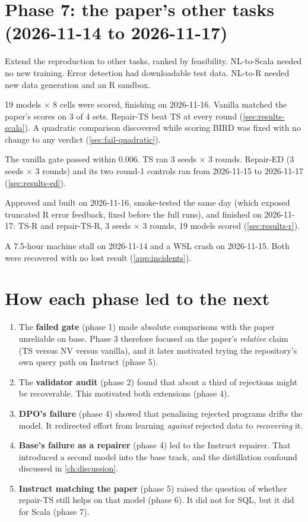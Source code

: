 \section{Phase 7: the paper's other tasks (2026-11-14 to 2026-11-17)}

\begin{description}[style=nextline,leftmargin=1.2em]
\item[Motivation.] Extend the reproduction to other tasks, ranked by feasibility. NL-to-Scala needed no new training.
Error detection had downloadable test data. NL-to-R needed new data generation and an R sandbox.
\item[NL-to-Scala.] 19 models $\times$ 8 cells were scored, finishing on 2026-11-16. Vanilla matched the paper's
scores on 3 of 4 sets. Repair-TS beat TS at every round (\cref{sec:results-scala}). A quadratic
comparison discovered while scoring BIRD was fixed with no change to any verdict (\cref{sec:fail-quadratic}).
\item[Error detection.] The vanilla gate passed within 0.006. TS ran 3 seeds $\times$ 3 rounds. Repair-ED (3 seeds $\times$
3 rounds) and its two round-1 controls ran from 2026-11-15 to 2026-11-17 (\cref{sec:results-ed}).
\item[NL-to-R.] Approved and built on 2026-11-16, smoke-tested the same day (which exposed truncated R error feedback,
fixed before the full runs), and finished on 2026-11-17: TS-R and repair-TS-R, 3 seeds $\times$ 3 rounds, 19 models
scored (\cref{sec:results-r}).
\item[Incidents.] A 7.5-hour machine stall on 2026-11-14 and a WSL crash on 2026-11-15. Both were recovered with no
lost result (\cref{app:incidents}).
\end{description}

\section{How each phase led to the next}

\begin{enumerate}
\item The \textbf{failed gate} (phase 1) made absolute comparisons with the paper unreliable on base. Phase 3
therefore focused on the paper's \emph{relative} claim (TS versus NV versus vanilla), and it later motivated trying
the repository's own query path on Instruct (phase 5).
\item The \textbf{validator audit} (phase 2) found that about a third of rejections might be recoverable. This
motivated both extensions (phase 4).
\item \textbf{DPO's failure} (phase 4) showed that penalising rejected programs drifts the model. It redirected effort
from learning \emph{against} rejected data to \emph{recovering} it.
\item \textbf{Base's failure as a repairer} (phase 4) led to the Instruct repairer. That introduced a second model
into the base track, and the distillation confound discussed in \cref{ch:discussion}.
\item \textbf{Instruct matching the paper} (phase 5) raised the question of whether repair-TS still helps on that
model (phase 6). It did not for SQL, but it did for Scala (phase 7).
\end{enumerate}
